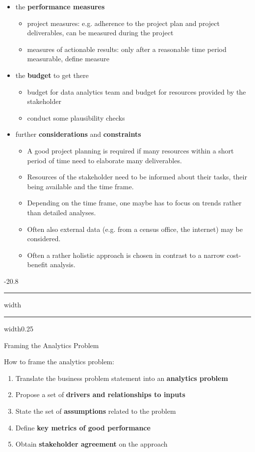 \documentclass[a4paper, landscape, 6pt, fleqn]{scrartcl}
\makeatletter
\renewcommand{\emph}[1]{\textbf{#1}}
\renewcommand{\section}{\@startsection{section}{1}{0mm}%
{-2\baselineskip}{0.8\baselineskip}%
{\hrule depth 0.2pt width\columnwidth\hrule depth1.5pt
width0.25\columnwidth\vspace*{1.2em}\Large\bfseries}}
\makeatother
\begin{document}
\begin{multicols*}{4}
\begin{itemize}
\begin{itemize}
(e.g. in marketing app. 4 months after implemention)
\end{itemize}
\item the \emph{performance measures}
\begin{itemize}
\item project measures: e.g. adherence to the project plan and project deliverables, can be measured during the project
\item measures of actionable results: only after a reasonable time period measurable, define measure
\end{itemize}
\item the \emph{budget} to get there
\begin{itemize}
\item budget for data analytics team and budget for resources provided by the stakeholder
\item conduct some plausibility checks
\end{itemize}
\item further \emph{considerations} and \emph{constraints}
\begin{itemize}
\item A good project planning is required if many resources within a short period of time need to elaborate many deliverables.
\item Resources of the stakeholder need to be informed about their tasks, their being available and the time frame.
\item Depending on the time frame, one maybe has to focus on trends rather than detailed analyses.
\item Often also external data (e.g. from a census office, the internet) may be considered.
\item Often a rather holistic approach is chosen in contrast to a narrow cost-benefit analysis.
\end{itemize}
\end{itemize}

\section{Framing the Analytics Problem}

How to frame the analytics problem:
\begin{enumerate}
\item Translate the business problem statement into an \emph{analytics problem}
\item Propose a set of \emph{drivers and relationships to inputs}
\item State the set of \emph{assumptions} related to the problem
\item Define \emph{key metrics of good performance}
\item Obtain \emph{stakeholder agreement} on the approach
\end{enumerate}


\end{multicols*}
\end{document}
